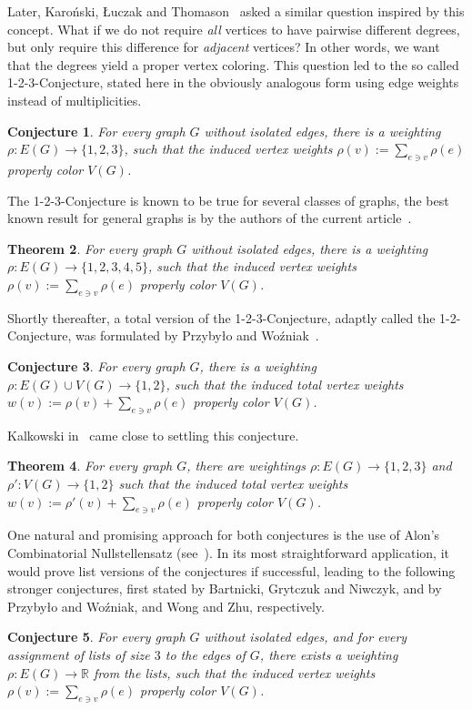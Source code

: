 \documentclass[reqno,12pt,epsf]{amsart}
\newtheorem{theorem}{Theorem}     %
\newtheorem{conjecture}[theorem]{Conjecture}
\def\omm{\rho}
\def\R{\mathbb{R}}
\begin{document}
Later, Karo\'{n}ski, {\L}uczak and Thomason~\cite{KLT} asked a similar question inspired by this concept. What if we do not require {\em all} vertices to have pairwise different degrees, but only require this difference for {\em adjacent} vertices? In other words, we want that the degrees yield a proper vertex coloring. This question led to the so called 1-2-3-Conjecture, stated here in the obviously analogous form using edge weights instead of multiplicities.
\begin{conjecture}\label{123}
For every graph $G$ without isolated edges, there is a weighting $\omm: E(G)\to \{1,2,3\}$,
such that the induced vertex weights $\omm(v):=\sum_{e \ni v}\omm(e)$ properly color $V(G)$.
\end{conjecture}
The 1-2-3-Conjecture is known to be true for several classes of graphs, the best known result for general graphs is by the authors of the current article~\cite{KKP}.
\begin{theorem}\label{125}
For every graph $G$ without isolated edges, there is a weighting $\omm: E(G)\to \{1,2,3,4,5\}$,
such that the induced vertex weights $\omm(v):=\sum_{e \ni v}\omm(e)$ properly color $V(G)$.
\end{theorem}
Shortly thereafter, a total version of the 1-2-3-Conjecture, adaptly called the 1-2-Conjecture, was formulated by Przyby{\l}o and Wo\'{z}niak~\cite{PW}.
\begin{conjecture}\label{12con}
For every graph $G$, there is a weighting $\omm: E(G)\cup V(G)\to \{1,2\}$,
such that the induced total vertex weights $w(v):=\omm(v)+\sum_{e \ni v}\omm(e)$ properly color $V(G)$.
\end{conjecture}
Kalkowski in~\cite{K} came close to settling this conjecture.
\begin{theorem}\label{tot123}
For every graph $G$, there are weightings $\omm: E(G)\to \{1,2,3\}$ and $\omm': V(G)\to \{1,2\}$
such that the induced total vertex weights $w(v):=\omm'(v)+\sum_{e \ni v}\omm(e)$ properly color $V(G)$.
\end{theorem}
One natural and promising approach for both conjectures is the use of Alon's Combinatorial Nullstellensatz (see~\cite{A}). In its most straightforward application, it would prove list versions of the conjectures if successful, leading to the following stronger conjectures, first stated by Bartnicki, Grytczuk and Niwczyk, and by Przyby{\l}o and Wo\'{z}niak, and Wong and Zhu, respectively.
\begin{conjecture}\label{123list}\cite{BGN}
For every graph $G$ without isolated edges, and for every assignment of lists of size $3$ to the edges of $G$, there exists a weighting $\omm: E(G)\to \R$ from the lists,
such that the induced vertex weights $\omm(v):=\sum_{e \ni v}\omm(e)$ properly color $V(G)$.
\end{conjecture}
\end{document}

